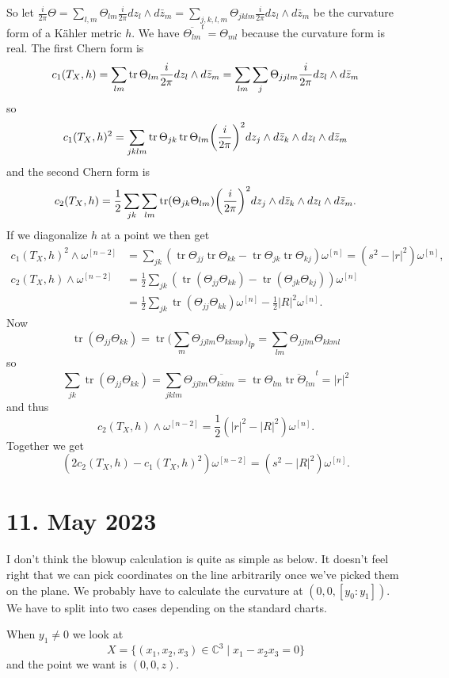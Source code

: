 \documentclass[11pt]{amsart}
\theoremstyle{definition}
\newcommand{\kk}[1]{\mathbb{#1}}
\def\^#1{^{[#1]}}
\def\ov#1{\overline{#1}}
\DeclareMathOperator{\tr}{tr}
\begin{document}
So let
$\frac{i}{2\pi} \Theta
= \sum_{l,m} \Theta_{lm} \frac{i}{2\pi} dz_l \wedge d\bar z_m
= \sum_{j,k,l,m} \Theta_{jklm} \frac{i}{2\pi} dz_l \wedge d\bar z_m$
be the curvature form of a K\"ahler metric $h$.
We have $\ov{\Theta_{lm}}^t = \Theta_{ml}$ because the curvature form is real.
The first Chern form is
$$
c_1(T_X,h)
= \sum_{lm} \tr\Theta_{lm} \fip dz_l \wedge d\bar z_m
= \sum_{lm} \sum_{j} \Theta_{jjlm} \fip dz_l \wedge d\bar z_m
$$
so
$$
c_1(T_X,h)^2
= \sum_{jklm} \tr\Theta_{jk} \tr \Theta_{lm}
\biggl(\fip\biggr)^2
dz_j \wedge d\bar z_k \wedge d z_l \wedge d \bar z_m
$$
and the second Chern form is
$$
c_2(T_X,h)
=
\frac12 \sum_{jk} \sum_{lm}
\tr(\Theta_{jk} \Theta_{lm})
\biggl(\fip\biggr)^2
dz_j \wedge d\bar z_k \wedge d z_l \wedge d \bar z_m.
$$
If we diagonalize $h$ at a point we then get
\begin{align*}
c_1(T_X,h)^2 \wedge \omega\^{n-2}
&= \sum_{jk} (\tr \Theta_{jj} \tr \Theta_{kk} - \tr \Theta_{jk} \tr \Theta_{kj})
\omega\^n
= (s^2 - |r|^2) \omega\^n,
\\
c_2(T_X,h) \wedge \omega\^{n-2}
&= \frac12 \sum_{jk} (\tr(\Theta_{jj} \Theta_{kk}) - \tr(\Theta_{jk}\Theta_{kj}))
\omega\^n
\\
&= \frac12 \sum_{jk} \tr(\Theta_{jj} \Theta_{kk}) \omega\^n - \frac12 |R|^2 \omega\^n.
\end{align*}
Now
$$
\tr(\Theta_{jj} \Theta_{kk})
= \tr\biggl(\sum_{m}\Theta_{jjlm} \Theta_{kkmp}\biggr)_{lp}
= \sum_{lm} \Theta_{jjlm} \Theta_{kkml}
$$
so
$$
\sum_{jk} \tr(\Theta_{jj} \Theta_{kk})
= \sum_{jklm} \Theta_{jjlm} \ov{\Theta_{kklm}}
= \tr \Theta_{lm} \ov{\tr \Theta_{lm}}^t
= |r|^2
$$
and thus
$$
c_2(T_X,h) \wedge \omega\^{n-2}
= \frac12 (|r|^2 - |R|^2)\omega\^n.
$$
Together we get
$$
(2c_2(T_X,h) - c_1(T_X,h)^2) \omega\^{n-2}
= (s^2 - |R|^2) \omega\^n.
$$



\section{11. May 2023}

I don't think the blowup calculation is quite as simple as below.
It doesn't feel right that we can pick coordinates on the line
arbitrarily once we've picked them on the plane.
We probably have to calculate the curvature at $(0,0,[y_0:y_1])$.
We have to split into two cases depending on the standard charts.

When $y_1 \not=0$ we look at
$$
X = \{(x_1,x_2,x_3) \in \kk C^3 \mid x_1 - x_2x_3 = 0 \}
$$
and the point we want is $(0,0,z)$.
\end{document}
